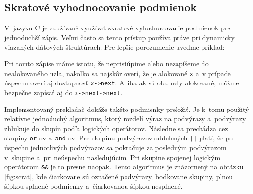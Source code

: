 \subsection{Skratové vyhodnocovanie podmienok}
V~jazyku C je zaužívané využívať skratové vyhodnocovanie podmienok pre jednoduchší zápis. Veľmi často sa tento prístup používa práve pri dynamicky viazaných dátových štruktúrach. Pre lepšie porozumenie uveďme príklad:


\noindent
Pri tomto zápise máme istotu, že nepristúpime alebo nezapíšeme do nealokovaného uzla, nakoľko sa najskôr overí, že je  alokované \texttt{x} a~v prípade úspechu overí aj dostupnosť \texttt{x->next}. A~iba ak sú oba uzly alokované, môžme bezpečne zapísať aj do \texttt{x->next->next}.

Implementovaný prekladač dokáže takéto podmienky preložiť. Je k~tomu použitý relatívne jednoduchý algoritmus, ktorý rozdelí výraz na podvýrazy a~podvýrazy zhlukuje do skupín podľa logických operátorov. Následne sa prechádza cez skupiny \texttt{or}-ov a~\texttt{and}-ov. Pre skupinu podvýrazov oddelených \texttt{||} platí, že po úspechu jednotlivých podvýrazov sa pokračuje za posledným podvýrazom v~skupine a~pri neúspechu nasledujúcim. Pri skupine spojenej logickým operátorom \texttt{\&\&} je to presne naopak. Tento algoritmus je znázornený na obrázku \ref{fig:scrat}, kde čiarkovane sú označené podvýrazy, bodkovane skupiny, plnou šípkou splnené podmienky a~čiarkovanou šípkou nesplnené.

